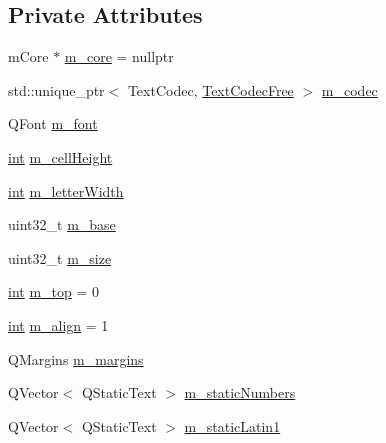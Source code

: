 \subsection*{Private Attributes}
\begin{DoxyCompactItemize}
\item 
m\+Core $\ast$ \mbox{\hyperlink{class_q_g_b_a_1_1_memory_model_a9a9edff522dbb085057d1a4c4751223c}{m\+\_\+core}} = nullptr
\item 
std\+::unique\+\_\+ptr$<$ Text\+Codec, \mbox{\hyperlink{class_q_g_b_a_1_1_memory_model_1_1_text_codec_free}{Text\+Codec\+Free}} $>$ \mbox{\hyperlink{class_q_g_b_a_1_1_memory_model_a608fa39674361bfd7012bd21ee0e4c87}{m\+\_\+codec}}
\item 
Q\+Font \mbox{\hyperlink{class_q_g_b_a_1_1_memory_model_aada44eec0d357993795cff64a92f7fa8}{m\+\_\+font}}
\item 
\mbox{\hyperlink{ioapi_8h_a787fa3cf048117ba7123753c1e74fcd6}{int}} \mbox{\hyperlink{class_q_g_b_a_1_1_memory_model_a11c1cb87968faa2ea6edba8d7fbe7164}{m\+\_\+cell\+Height}}
\item 
\mbox{\hyperlink{ioapi_8h_a787fa3cf048117ba7123753c1e74fcd6}{int}} \mbox{\hyperlink{class_q_g_b_a_1_1_memory_model_a73909e6cd99ee42eef5380a1355f9178}{m\+\_\+letter\+Width}}
\item 
uint32\+\_\+t \mbox{\hyperlink{class_q_g_b_a_1_1_memory_model_a4c09c6927ef4997d88511685c6553385}{m\+\_\+base}}
\item 
uint32\+\_\+t \mbox{\hyperlink{class_q_g_b_a_1_1_memory_model_af0109e3a35f844416b5c84e3de8958dc}{m\+\_\+size}}
\item 
\mbox{\hyperlink{ioapi_8h_a787fa3cf048117ba7123753c1e74fcd6}{int}} \mbox{\hyperlink{class_q_g_b_a_1_1_memory_model_ada821e27e74aef98f2f57132911f50e9}{m\+\_\+top}} = 0
\item 
\mbox{\hyperlink{ioapi_8h_a787fa3cf048117ba7123753c1e74fcd6}{int}} \mbox{\hyperlink{class_q_g_b_a_1_1_memory_model_a5b51991da86ac0ff576888a73f7e726d}{m\+\_\+align}} = 1
\item 
Q\+Margins \mbox{\hyperlink{class_q_g_b_a_1_1_memory_model_a68fd2b88456cd9bc5de9cca5b1866656}{m\+\_\+margins}}
\item 
Q\+Vector$<$ Q\+Static\+Text $>$ \mbox{\hyperlink{class_q_g_b_a_1_1_memory_model_afdebb854b54c151e087fe7b67afe5645}{m\+\_\+static\+Numbers}}
\item 
Q\+Vector$<$ Q\+Static\+Text $>$ \mbox{\hyperlink{class_q_g_b_a_1_1_memory_model_a0cbdd728e9304f4513890db432dcee6e}{m\+\_\+static\+Latin1}}
\item 

\end{DoxyCompactItemize}
